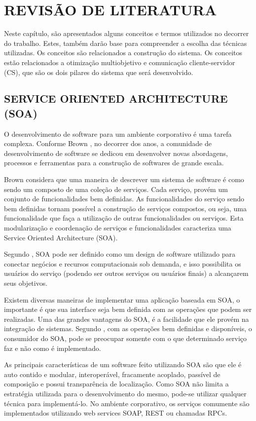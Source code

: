 \chapter{REVISÃO DE LITERATURA}
\label{chap:fundamentacaoTeorica}

Neste capítulo, são apresentados alguns conceitos e termos utilizados no decorrer do trabalho. 
Estes, também darão base para compreender a escolha das técnicas utilizadas. 
Os conceitos são relacionados a construção do sistema. 
Os conceitos estão relacionados a otimização multiobjetivo e comunicação cliente-servidor (CS), 
que são os dois pilares do sistema que será desenvolvido.

\section{SERVICE ORIENTED ARCHITECTURE (SOA)}
O desenvolvimento de software para um ambiente corporativo é uma tarefa complexa. 
Conforme Brown \cite{brown}, no decorrer dos anos, a comunidade de desenvolvimento de software se 
dedicou em desenvolver novas abordagens, processos e ferramentas para a construção de softwares de 
grande escala. 

Brown considera que uma maneira de descrever um sistema de software é como sendo um composto de 
uma coleção de serviços. Cada serviço, provém um conjunto de funcionalidades bem definidas. 
As funcionalidades do serviço sendo bem definidas tornam possível a construção de serviços 
compostos, ou seja, uma funcionalidade que faça a utilização de outras funcionalidades ou serviços. 
Esta modularização e coordenação de serviços e funcionalidades caracteriza uma 
Service Oriented Architecture (SOA).

Segundo \cite{valipour}, SOA pode ser definido como um design de software utilizado para 
conectar negócios e recursos computacionais sob demanda, e isso possibilita os usuários 
do serviço (podendo ser outros serviços ou usuários finais) a alcançarem seus objetivos. 

Existem diversas maneiras de implementar uma aplicação baseada em SOA, o importante é que 
sua interface seja bem definida com as operações que podem ser realizadas. 
Uma das grandes vantagens do SOA, é a facilidade que ele provém na integração de sistemas. 
Segundo \cite{valipour}, com as operações bem definidas e disponíveis, o consumidor do SOA, 
pode se preocupar somente com o que determinado serviço faz e não como é implementado.

As principais características de um software feito utilizando SOA são que ele é auto contido e 
modular, interoperável, fracamente acoplado, passível de composição e possui transparência de localização. 
Como SOA não limita a estratégia utilizada para o desenvolvimento do mesmo, pode-se utilizar qualquer 
técnica para implementá-lo. No ambiente corporativo, os serviços comumente são implementados 
utilizando web services SOAP, REST ou chamadas RPCs.

